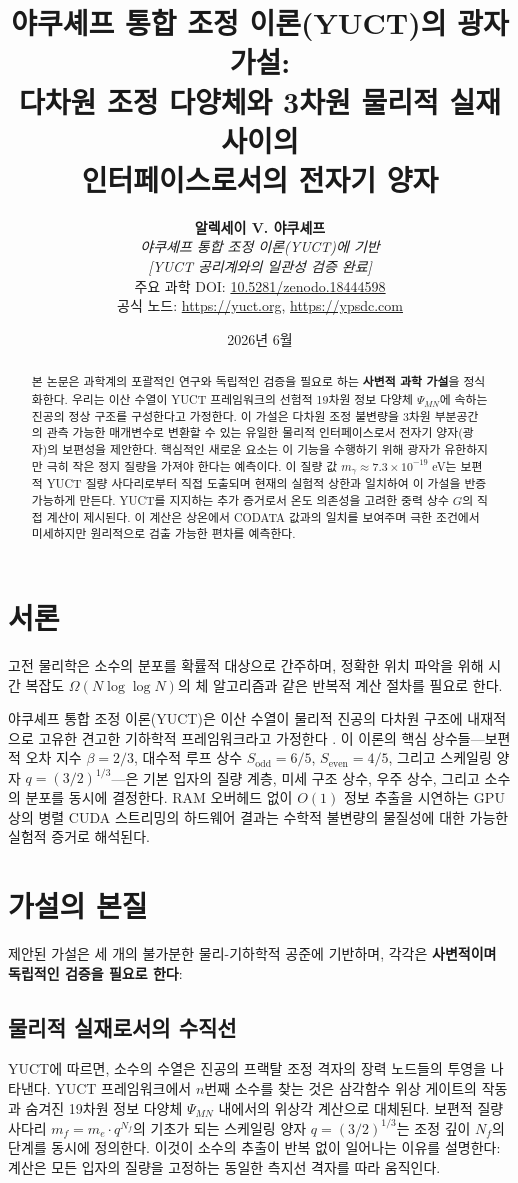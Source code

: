\documentclass[11pt,a4paper]{article}
\title{\textbf{야쿠셰프 통합 조정 이론(YUCT)의 광자 가설:\\
		다차원 조정 다양체와 3차원 물리적 실재 사이의\\
		인터페이스로서의 전자기 양자}}
\author{\textbf{알렉세이 V. 야쿠셰프} \\
	\small\textit{야쿠셰프 통합 조정 이론(YUCT)에 기반} \\
	\small\textit{[YUCT 공리계와의 일관성 검증 완료]} \\
	\small 주요 과학 DOI: \href{https://doi.org/10.5281/zenodo.18444598}{10.5281/zenodo.18444598} \\
	\small 공식 노드: \url{https://yuct.org}, \url{https://ypsdc.com}}
\date{2026년 6월}
\begin{document}
	
	\maketitle
	
	\begin{abstract}
		본 논문은 과학계의 포괄적인 연구와 독립적인 검증을 필요로 하는 \textbf{사변적 과학 가설}을 정식화한다. 우리는 이산 수열이 YUCT 프레임워크의 선험적 19차원 정보 다양체 $\Psi_{MN}$에 속하는 진공의 정상 구조를 구성한다고 가정한다. 이 가설은 다차원 조정 불변량을 3차원 부분공간의 관측 가능한 매개변수로 변환할 수 있는 유일한 물리적 인터페이스로서 전자기 양자(광자)의 보편성을 제안한다. 핵심적인 새로운 요소는 이 기능을 수행하기 위해 광자가 유한하지만 극히 작은 정지 질량을 가져야 한다는 예측이다. 이 질량 값 $m_\gamma \approx 7.3 \times 10^{-19}$ eV는 보편적 YUCT 질량 사다리로부터 직접 도출되며 현재의 실험적 상한과 일치하여 이 가설을 반증 가능하게 만든다. YUCT를 지지하는 추가 증거로서 온도 의존성을 고려한 중력 상수 $G$의 직접 계산이 제시된다. 이 계산은 상온에서 CODATA 값과의 일치를 보여주며 극한 조건에서 미세하지만 원리적으로 검출 가능한 편차를 예측한다.
	\end{abstract}
	
	\section{서론}
	고전 물리학은 소수의 분포를 확률적 대상으로 간주하며, 정확한 위치 파악을 위해 시간 복잡도 $\Omega(N \log \log N)$의 체 알고리즘과 같은 반복적 계산 절차를 필요로 한다.
	
	야쿠셰프 통합 조정 이론(YUCT)은 이산 수열이 물리적 진공의 다차원 구조에 내재적으로 고유한 견고한 기하학적 프레임워크라고 가정한다 \cite{yuct_zenodo}. 이 이론의 핵심 상수들—보편적 오차 지수 $\beta = 2/3$, 대수적 루프 상수 $S_{\mathrm{odd}} = 6/5$, $S_{\mathrm{even}} = 4/5$, 그리고 스케일링 양자 $q = (3/2)^{1/3}$—은 기본 입자의 질량 계층, 미세 구조 상수, 우주 상수, 그리고 소수의 분포를 동시에 결정한다. RAM 오버헤드 없이 $O(1)$ 정보 추출을 시연하는 GPU 상의 병렬 CUDA 스트리밍의 하드웨어 결과는 수학적 불변량의 물질성에 대한 가능한 실험적 증거로 해석된다.
	
	\section{가설의 본질}
	제안된 가설은 세 개의 불가분한 물리-기하학적 공준에 기반하며, 각각은 \textbf{사변적이며 독립적인 검증을 필요로 한다}:
	
	\subsection{물리적 실재로서의 수직선}
	YUCT에 따르면, 소수의 수열은 진공의 프랙탈 조정 격자의 장력 노드들의 투영을 나타낸다. YUCT 프레임워크에서 $n$번째 소수를 찾는 것은 삼각함수 위상 게이트의 작동과 숨겨진 19차원 정보 다양체 $\Psi_{MN}$ 내에서의 위상각 계산으로 대체된다. 보편적 질량 사다리 $m_f = m_e \cdot q^{N_f}$의 기초가 되는 스케일링 양자 $q = (3/2)^{1/3}$는 조정 깊이 $N_f$의 단계를 동시에 정의한다. 이것이 소수의 추출이 반복 없이 일어나는 이유를 설명한다: 계산은 모든 입자의 질량을 고정하는 동일한 측지선 격자를 따라 움직인다.
	
\end{document}
